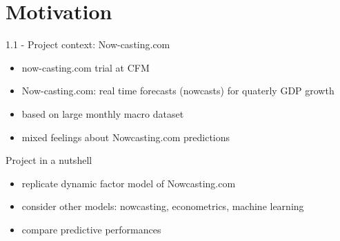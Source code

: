 \section{Motivation}


\begin{frame}{1.1 - Project context: Now-casting.com}
	\begin{itemize}
	\item now-casting.com trial at CFM
	\item Now-casting.com: real time forecasts (nowcasts) for quaterly GDP growth
	\item based on large monthly macro dataset
	\item mixed feelings about Nowcasting.com predictions
	\end{itemize}

	\pause
	
	\begin{block}{Project in a nutshell}
		\begin{itemize}
		\item replicate dynamic factor model of Nowcasting.com
		\item consider other models: nowcasting, econometrics, machine learning
		\item compare predictive performances
		\end{itemize}
	\end{block}	
\end{frame}





